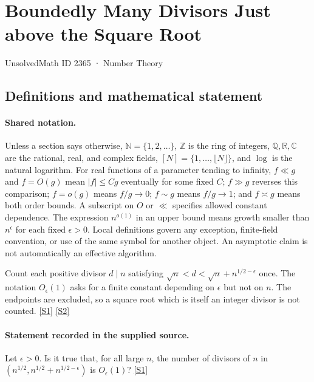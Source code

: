 \documentclass[11pt,a4paper]{article}
\newcommand{\N}{\mathbb{N}}
\newcommand{\Z}{\mathbb{Z}}
\newcommand{\Q}{\mathbb{Q}}
\newcommand{\R}{\mathbb{R}}
\newcommand{\C}{\mathbb{C}}
\newcommand{\sref}[2]{\hyperlink{source:#1:#2}{[S#2]}}
\begin{document}

\setcounter{section}{2364}

\section{Boundedly Many Divisors Just above the Square Root}\label{2365}

{\small\sffamily UnsolvedMath ID 2365 · Number Theory}

\subsection{Definitions and mathematical statement}

\paragraph{Shared notation.}Unless a section says otherwise, $\N=\{1,2,\ldots\}$,
$\Z$ is the ring of integers, $\Q,\R,\C$ are the rational, real, and complex
fields, $[N]=\{1,\ldots,\lfloor N\rfloor\}$, and $\log$ is the natural
logarithm. For real functions of a parameter tending to infinity,
$f\ll g$ and $f=O(g)$ mean $|f|\leq Cg$ eventually for some fixed $C$;
$f\gg g$ reverses this comparison; $f=o(g)$ means $f/g\to0$;
$f\sim g$ means $f/g\to1$; and $f\asymp g$ means both order bounds.
A subscript on $O$ or $\ll$ specifies allowed constant dependence.
The expression $n^{o(1)}$ in an upper bound means growth smaller than
$n^\epsilon$ for each fixed $\epsilon>0$. Local definitions govern any
exception, finite-field convention, or use of the same symbol for another
object. An asymptotic claim is not automatically an effective algorithm.



Count each positive divisor $d\mid n$ satisfying $\sqrt n<d<\sqrt n+n^{1/2-\epsilon}$ once. The notation $O_\epsilon(1)$ asks for a finite constant depending on $\epsilon$ but not on $n$. The endpoints are excluded, so a square root which is itself an integer divisor is not counted. \sref{2365}{1} \sref{2365}{2}

\paragraph{Statement recorded in the supplied source.}
Let $\epsilon>0$. Is it true that, for all large $n$, the number of divisors of $n$ in $(n^{1/2},n^{1/2}+n^{1/2-\epsilon})$ is $O_\epsilon(1)$? \sref{2365}{1}
\end{document}
